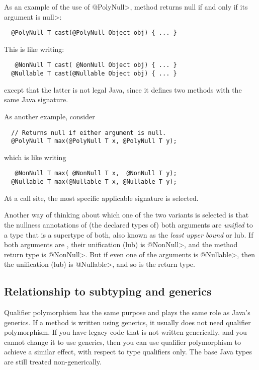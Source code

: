 As an example of the use of \<@PolyNull>, method 
returns null if and only if its argument is \<null>:

\begin{Verbatim}
  @PolyNull T cast(@PolyNull Object obj) { ... }
\end{Verbatim}

\noindent
This is like writing:

\begin{Verbatim}
   @NonNull T cast( @NonNull Object obj) { ... }
  @Nullable T cast(@Nullable Object obj) { ... }
\end{Verbatim}

\noindent
except that the latter is not legal Java, since it defines two
methods with the same Java signature.


As another example, consider

\begin{Verbatim}
  // Returns null if either argument is null.
  @PolyNull T max(@PolyNull T x, @PolyNull T y);
\end{Verbatim}

\noindent
which is like writing

\begin{Verbatim}
   @NonNull T max( @NonNull T x,  @NonNull T y);
  @Nullable T max(@Nullable T x, @Nullable T y);
\end{Verbatim}

\noindent
At a call site, the most specific applicable signature is selected.

Another way of thinking about which one of the two  variants is
selected is that the nullness annotations of (the declared types of) both
arguments are \emph{unified} to a type that is a supertype of both, also
known as the \emph{least upper bound} or lub.  If both
arguments are , their unification (lub) is \<@NonNull>, and the
method return type is \<@NonNull>.  But if even one of the arguments is \<@Nullable>,
then the unification (lub) is \<@Nullable>, and so is the return type.



\subsection{Relationship to subtyping and generics\label{qualifier-polymorhism-vs-subtyping}}

Qualifier polymorphism has the same purpose and plays the same role as
Java's generics.  If a method is written using generics, it usually does
not need qualifier polymorphism.  If you have legacy code that is not
written generically, and you cannot change it to use generics, then you can
use qualifier polymorphism to achieve a similar effect, with respect to
type qualifiers only.  The base Java types are still treated non-generically.

